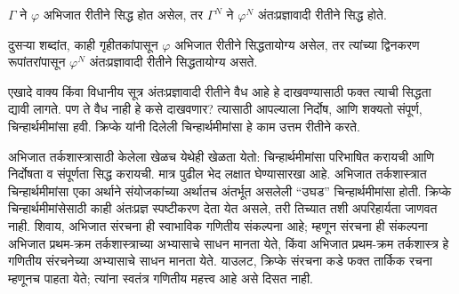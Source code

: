 \begin{thm}
$\Gamma$ ने $\varphi$ अभिजात रीतीने सिद्ध होत असेल, तर $\Gamma^N$ ने $\varphi^N$
अंतःप्रज्ञावादी रीतीने सिद्ध होते.
\end{thm}

दुसऱ्या शब्दांत, काही गृहीतकांपासून $\varphi$ अभिजात रीतीने सिद्धतायोग्य असेल,
तर त्यांच्या द्विनकरण रूपांतरांपासून $\varphi^N$ अंतःप्रज्ञावादी रीतीने
सिद्धतायोग्य असते.

एखादे वाक्य किंवा विधानीय सूत्र अंतःप्रज्ञावादी रीतीने वैध आहे हे
दाखवण्यासाठी फक्त त्याची सिद्धता द्यावी लागते. पण ते वैध नाही हे कसे
दाखवणार? त्यासाठी आपल्याला निर्दोष, आणि शक्यतो संपूर्ण, चिन्हार्थमीमांसा हवी.
क्रिप्के यांनी दिलेली चिन्हार्थमीमांसा हे काम उत्तम रीतीने करते.

अभिजात तर्कशास्त्रासाठी केलेला खेळच येथेही खेळता येतो: चिन्हार्थमीमांसा
परिभाषित करायची आणि निर्दोषता व संपूर्णता सिद्ध करायची. मात्र पुढील भेद लक्षात
घेण्यासारखा आहे. अभिजात तर्कशास्त्रात चिन्हार्थमीमांसा एका अर्थाने
संयोजकांच्या अर्थातच अंतर्भूत असलेली “उघड” चिन्हार्थमीमांसा होती. क्रिप्के
चिन्हार्थमीमांसेसाठी काही अंतःप्रज्ञ स्पष्टीकरण देता येत असले, तरी तिच्यात
तशी अपरिहार्यता जाणवत नाही. शिवाय, अभिजात संरचना ही स्वाभाविक गणितीय
संकल्पना आहे; म्हणून संरचना ही संकल्पना अभिजात प्रथम-क्रम
तर्कशास्त्राच्या अभ्यासाचे साधन मानता येते, किंवा अभिजात प्रथम-क्रम
तर्कशास्त्र हे गणितीय संरचनेच्या अभ्यासाचे साधन मानता येते.
याउलट, क्रिप्के संरचना कडे फक्त तार्किक रचना म्हणूनच पाहता येते;
त्यांना स्वतंत्र गणितीय महत्त्व आहे असे दिसत नाही.

